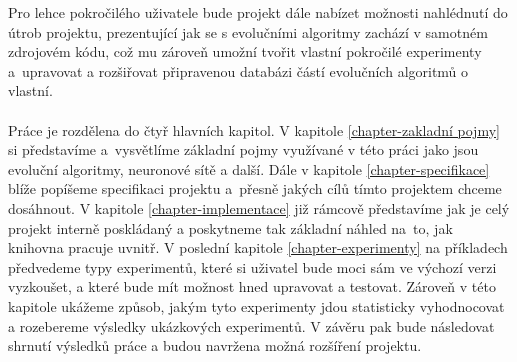 Pro lehce pokročilého uživatele bude projekt dále nabízet možnosti nahlédnutí
do útrob projektu, prezentující jak se s evolučními algoritmy zachází v
samotném zdrojovém kódu, což mu zároveň umožní tvořit vlastní pokročilé
experimenty a~upravovat a rozšiřovat připravenou databázi částí evolučních
algoritmů o vlastní.

\paragraph{}
Práce je rozdělena do čtyř hlavních kapitol. V kapitole
\ref{chapter-zakladní pojmy} si představíme a~vysvětlíme základní pojmy
využívané v této práci jako jsou evoluční algoritmy, neuronové sítě a další.
Dále v kapitole \ref{chapter-specifikace} blíže popíšeme specifikaci projektu
a~přesně jakých cílů tímto projektem chceme dosáhnout. V kapitole
\ref{chapter-implementace} již rámcově představíme jak je celý projekt interně
poskládaný a poskytneme tak základní náhled na~to, jak knihovna pracuje uvnitř.
V poslední kapitole \ref{chapter-experimenty} na příkladech předvedeme
typy experimentů, které si uživatel bude moci sám ve výchozí verzi vyzkoušet, a
které bude mít možnost hned upravovat a testovat. Zároveň v této kapitole
ukážeme způsob, jakým tyto experimenty jdou statisticky vyhodnocovat a
rozebereme výsledky ukázkových experimentů. V závěru pak bude následovat
shrnutí výsledků práce a budou navržena možná rozšíření projektu.
